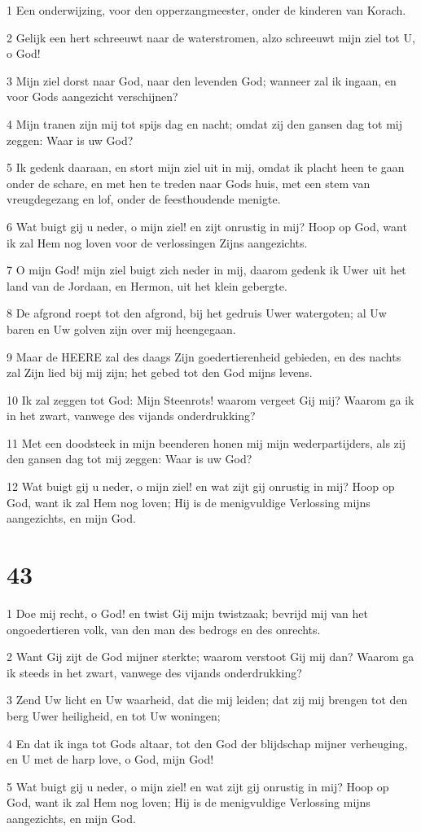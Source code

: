 \par 1 Een onderwijzing, voor den opperzangmeester, onder de kinderen van Korach.
\par 2 Gelijk een hert schreeuwt naar de waterstromen, alzo schreeuwt mijn ziel tot U, o God!
\par 3 Mijn ziel dorst naar God, naar den levenden God; wanneer zal ik ingaan, en voor Gods aangezicht verschijnen?
\par 4 Mijn tranen zijn mij tot spijs dag en nacht; omdat zij den gansen dag tot mij zeggen: Waar is uw God?
\par 5 Ik gedenk daaraan, en stort mijn ziel uit in mij, omdat ik placht heen te gaan onder de schare, en met hen te treden naar Gods huis, met een stem van vreugdegezang en lof, onder de feesthoudende menigte.
\par 6 Wat buigt gij u neder, o mijn ziel! en zijt onrustig in mij? Hoop op God, want ik zal Hem nog loven voor de verlossingen Zijns aangezichts.
\par 7 O mijn God! mijn ziel buigt zich neder in mij, daarom gedenk ik Uwer uit het land van de Jordaan, en Hermon, uit het klein gebergte.
\par 8 De afgrond roept tot den afgrond, bij het gedruis Uwer watergoten; al Uw baren en Uw golven zijn over mij heengegaan.
\par 9 Maar de HEERE zal des daags Zijn goedertierenheid gebieden, en des nachts zal Zijn lied bij mij zijn; het gebed tot den God mijns levens.
\par 10 Ik zal zeggen tot God: Mijn Steenrots! waarom vergeet Gij mij? Waarom ga ik in het zwart, vanwege des vijands onderdrukking?
\par 11 Met een doodsteek in mijn beenderen honen mij mijn wederpartijders, als zij den gansen dag tot mij zeggen: Waar is uw God?
\par 12 Wat buigt gij u neder, o mijn ziel! en wat zijt gij onrustig in mij? Hoop op God, want ik zal Hem nog loven; Hij is de menigvuldige Verlossing mijns aangezichts, en mijn God.

\chapter{43}

\par 1 Doe mij recht, o God! en twist Gij mijn twistzaak; bevrijd mij van het ongoedertieren volk, van den man des bedrogs en des onrechts.
\par 2 Want Gij zijt de God mijner sterkte; waarom verstoot Gij mij dan? Waarom ga ik steeds in het zwart, vanwege des vijands onderdrukking?
\par 3 Zend Uw licht en Uw waarheid, dat die mij leiden; dat zij mij brengen tot den berg Uwer heiligheid, en tot Uw woningen;
\par 4 En dat ik inga tot Gods altaar, tot den God der blijdschap mijner verheuging, en U met de harp love, o God, mijn God!
\par 5 Wat buigt gij u neder, o mijn ziel! en wat zijt gij onrustig in mij? Hoop op God, want ik zal Hem nog loven; Hij is de menigvuldige Verlossing mijns aangezichts, en mijn God.

